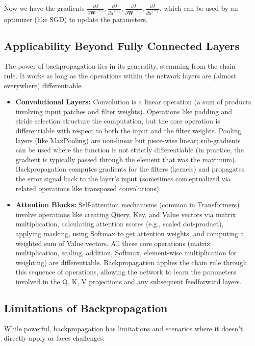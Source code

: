 \documentclass{article}
\newcommand{\bW}{\bm{W}}
\newcommand{\bb}{\bm{b}}
\begin{document}
Now we have the gradients $\frac{\partial J}{\partial \bW^{(1)}}, \frac{\partial J}{\partial \bb^{(1)}}, \frac{\partial J}{\partial \bW^{(2)}}, \frac{\partial J}{\partial \bb^{(2)}}$, which can be used by an optimizer (like SGD) to update the parameters.

\subsection{Applicability Beyond Fully Connected Layers}
The power of backpropagation lies in its generality, stemming from the chain rule. It works as long as the operations within the network layers are (almost everywhere) differentiable.

\begin{itemize}
    \item \textbf{Convolutional Layers:} Convolution is a linear operation (a sum of products involving input patches and filter weights). Operations like padding and stride selection structure the computation, but the core operation is differentiable with respect to both the input and the filter weights. Pooling layers (like MaxPooling) are non-linear but piece-wise linear; sub-gradients can be used where the function is not strictly differentiable (in practice, the gradient is typically passed through the element that was the maximum). Backpropagation computes gradients for the filters (kernels) and propagates the error signal back to the layer's input (sometimes conceptualized via related operations like transposed convolutions).
    \item \textbf{Attention Blocks:} Self-attention mechanisms (common in Transformers) involve operations like creating Query, Key, and Value vectors via matrix multiplication, calculating attention scores (e.g., scaled dot-product), applying masking, using Softmax to get attention weights, and computing a weighted sum of Value vectors. All these core operations (matrix multiplication, scaling, addition, Softmax, element-wise multiplication for weighting) are differentiable. Backpropagation applies the chain rule through this sequence of operations, allowing the network to learn the parameters involved in the Q, K, V projections and any subsequent feedforward layers.
\end{itemize}

\subsection{Limitations of Backpropagation}
While powerful, backpropagation has limitations and scenarios where it doesn't directly apply or faces challenges:
\end{document}
